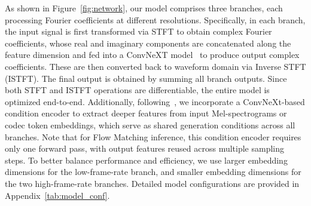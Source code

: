 As shown in Figure~\ref{fig:network}, our model comprises three branches, each processing Fourier coefficients at different resolutions. Specifically, in each branch, the input signal is first transformed via STFT to obtain complex Fourier coefficients, whose real and imaginary components are concatenated along the feature dimension and fed into a ConvNeXT model~\citep{convnext} to produce output complex coefficients. These are then converted back to waveform domain via Inverse STFT (ISTFT). The final output is obtained by summing all branch outputs. Since both STFT and ISTFT operations are differentiable, the entire model is optimized end-to-end. Additionally, following~\citep{periodwave}, we incorporate a ConvNeXt-based condition encoder to extract deeper features from input Mel-spectrograms or codec token embeddings, which serve as shared generation conditions across all branches. Note that for Flow Matching inference, this condition encoder requires only one forward pass, with output features reused across multiple sampling steps. To better balance performance and efficiency, we use larger embedding dimensions for the low-frame-rate branch, and smaller embedding dimensions for the two high-frame-rate branches. Detailed model configurations are provided in Appendix~\ref{tab:model_conf}.  








